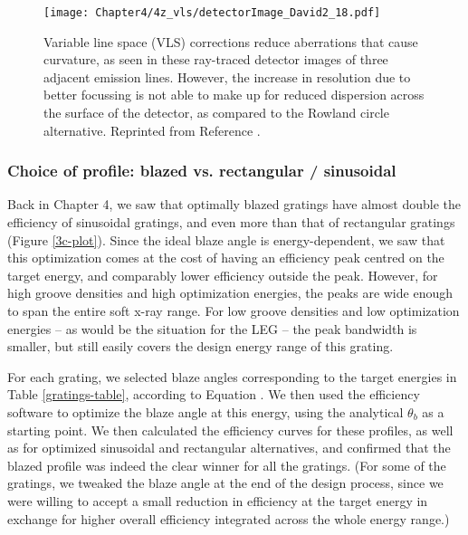 \begin{figure}[p] %
   \centering
   \texttt{[image: Chapter4/4z\_vls/detectorImage\_David2\_18.pdf]} 
   \caption[Variable line space (VLS) corrections reduce aberrations that cause curvature, as seen in these ray-traced detector images of three adjacent emission lines.  However, the increase in resolution due to better focussing is not able to make up for reduced dispersion across the surface of the detector.]{Variable line space (VLS) corrections reduce aberrations that cause curvature, as seen in these ray-traced detector images of three adjacent emission lines.  However, the increase in resolution due to better focussing is not able to make up for reduced dispersion across the surface of the detector, as compared to the Rowland circle alternative. Reprinted from Reference \cite[Figure 2.18]{Mui06}.}
   \label{vlsImage}
\end{figure}

\subsubsection{Choice of profile: blazed vs. rectangular / sinusoidal}
Back in Chapter 4, we saw that optimally blazed gratings have almost double the efficiency of sinusoidal gratings, and even more than that of rectangular gratings (Figure \ref{3c-plot}).  Since the ideal blaze angle is energy-dependent, we saw that this optimization comes at the cost of having an efficiency peak centred on the target energy, and comparably lower efficiency outside the peak.  However, for high groove densities and high optimization energies, the peaks are wide enough to span the entire soft x-ray range.  For low groove densities and low optimization energies -- as would be the situation for the LEG -- the peak bandwidth is smaller, but still easily covers the design energy range of this grating.

For each grating, we selected blaze angles corresponding to the target energies in Table \ref{gratings-table}, according to Equation .  We then used the efficiency software to optimize the blaze angle at this energy, using the analytical $\theta_b$ as a starting point.  We then calculated the efficiency curves for these profiles, as well as for optimized sinusoidal and rectangular alternatives, and confirmed that the blazed profile was indeed the clear winner for all the gratings.  (For some of the gratings, we tweaked the blaze angle at the end of the design process, since we were willing to accept a small reduction in efficiency at the target energy in exchange for higher overall efficiency integrated across the whole energy range.)
        
